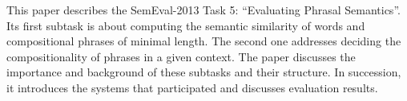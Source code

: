 This paper describes the SemEval-2013 Task 5: ``Evaluating Phrasal Semantics''. Its first subtask is about computing the semantic similarity of
 words and compositional phrases of minimal length. The second one addresses
 deciding the compositionality of phrases in a given context. The paper
 discusses the importance and background of these subtasks and their structure.
 In succession, it introduces the systems that participated and discusses
 evaluation results.

